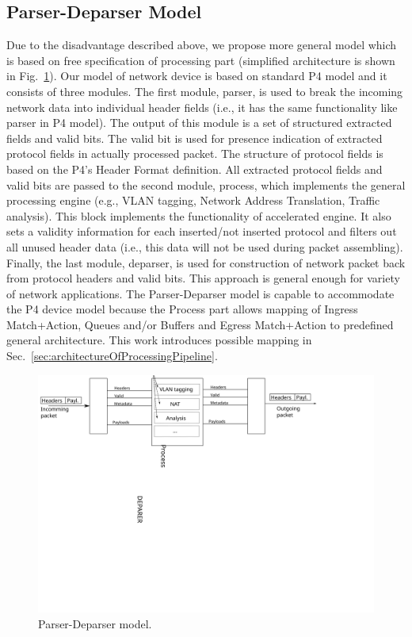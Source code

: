 \subsection{Parser-Deparser Model}
\label{sec:parserDeparserModel}
Due to the disadvantage described above, we propose more general model which is based on free specification of processing part 
(simplified architecture is shown in Fig.~\ref{fig:parserDeparserArchitecture}). 
Our model of network device is based on standard P4 model and it consists of three modules. 
The first module, parser, is used to break the incoming network data into individual header fields
(i.e., it has the same functionality like parser in P4 model).
The output of this module is a set of structured extracted fields and valid bits.
The valid bit is used for presence indication of extracted protocol fields in actually processed packet.
The structure of protocol fields is based on the P4's Header Format definition. 
All extracted protocol fields and valid bits are passed to the second module, process, 
which implements the general processing engine (e.g., VLAN tagging, Network Address Translation, Traffic analysis). 
This block implements the functionality of accelerated engine. It also sets a validity information for each inserted/not inserted protocol 
and filters out all unused header data (i.e., this data will not be used during packet assembling). 
Finally, the last module, deparser, is used for construction of network packet back from protocol headers and valid bits.
This approach is general enough for variety of network applications. The Parser-Deparser model is capable to accommodate the P4 device model 
because the Process part allows mapping of Ingress Match+Action, Queues and/or Buffers and Egress Match+Action to predefined general architecture. 
This work introduces possible mapping in Sec.~\ref{sec:architectureOfProcessingPipeline}.

\begin{figure}[t]
    \centering
    \includegraphics[width=\textwidth]{chapters/pic/ParserDeparserApproach}
    \caption{Parser-Deparser model.}
    \label{fig:parserDeparserArchitecture}
\end{figure} 

